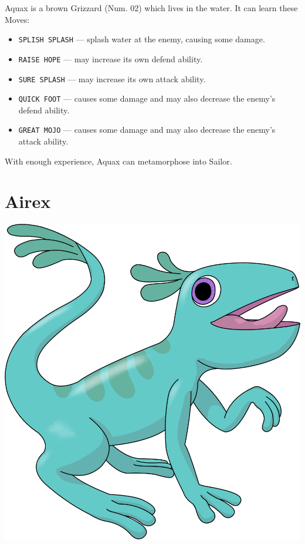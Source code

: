 \documentclass[10pt,twocolumn,openany,article]{memoir}
\begin{document}
Aquax is  a brown Grizzard  (Num. 02) which lives  in the water.  It can
learn these Moves:

\begin{itemize}
\item  \texttt{SPLISH SPLASH}  --- splash  water at  the enemy,  causing
  some damage. 
\item \texttt{RAISE HOPE} --- may increase its own defend ability.
\item \texttt{SURE SPLASH} --- may increase its own attack ability.
\item \texttt{QUICK FOOT}  --- causes some damage and  may also decrease
  the enemy's defend ability.
\item \texttt{GREAT MOJO}  --- causes some damage and  may also decrease
  the enemy's attack ability.
\end{itemize}

With enough experience, Aquax can metamorphose into Sailor.

\ifdefined\DEMO\else

\section{Airex}

\includegraphics[width=\columnwidth]{../Manual/Airex.png}
\end{document}
